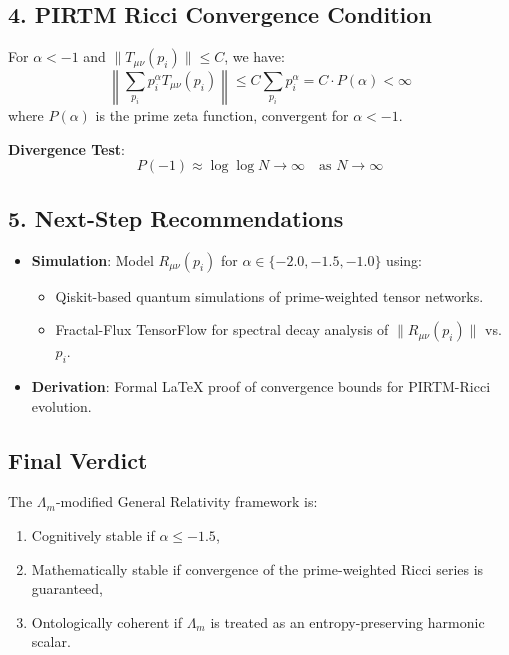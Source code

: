 \documentclass[12pt]{article}
\theoremstyle{plain}
\begin{document}
\subsection*{4. PIRTM Ricci Convergence Condition}

For \( \alpha < -1 \) and \( \|T_{\mu\nu}(p_i)\| \leq C \), we have:
\[
\left\| \sum_{p_i} p_i^\alpha T_{\mu\nu}(p_i) \right\| \leq C \sum_{p_i} p_i^\alpha = C \cdot P(\alpha) < \infty
\]
where \( P(\alpha) \) is the prime zeta function, convergent for \( \alpha < -1 \).

\noindent\textbf{Divergence Test}:
\[
P(-1) \approx \log \log N \rightarrow \infty \quad \text{as } N \to \infty
\]

\subsection*{5. Next-Step Recommendations}

\begin{itemize}
    \item \textbf{Simulation}: Model \( R_{\mu\nu}(p_i) \) for \( \alpha \in \{-2.0, -1.5, -1.0\} \) using:
    \begin{itemize}
        \item Qiskit-based quantum simulations of prime-weighted tensor networks.
        \item Fractal-Flux TensorFlow for spectral decay analysis of \( \|R_{\mu\nu}(p_i)\| \) vs. \( p_i \).
    \end{itemize}
    \item \textbf{Derivation}: Formal LaTeX proof of convergence bounds for PIRTM-Ricci evolution.
\end{itemize}

\subsection*{Final Verdict}

The \(\Lambda_m\)-modified General Relativity framework is:
\begin{enumerate}
    \item Cognitively stable if \( \alpha \leq -1.5 \),
    \item Mathematically stable if convergence of the prime-weighted Ricci series is guaranteed,
    \item Ontologically coherent if \(\Lambda_m\) is treated as an entropy-preserving harmonic scalar.
\end{enumerate}
\end{document}
